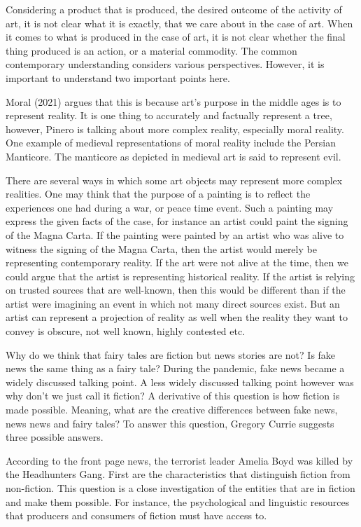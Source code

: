 \documentclass[
  letterpaper,
  DIV=11,
  numbers=noendperiod]{scrreprt}
\begin{document}
\begin{tcolorbox}[enhanced jigsaw, arc=.35mm, breakable, rightrule=.15mm, colback=white, colframe=quarto-callout-important-color-frame, bottomrule=.15mm, leftrule=.75mm, opacityback=0, toprule=.15mm, left=2mm]
\begin{tcolorbox}[enhanced jigsaw, arc=.35mm, breakable, rightrule=.15mm, colback=white, colframe=quarto-callout-tip-color-frame, bottomrule=.15mm, leftrule=.75mm, opacityback=0, toprule=.15mm, left=2mm]
Considering a product that is produced, the desired outcome of the
activity of art, it is not clear what it is exactly, that we care about
in the case of art. When it comes to what is produced in the case of
art, it is not clear whether the final thing produced is an action, or a
material commodity. The common contemporary understanding considers
various perspectives. However, it is important to understand two
important points here.

Moral (2021) argues that this is because art's purpose in the middle
ages is to represent reality. It is one thing to accurately and
factually represent a tree, however, Pinero is talking about more
complex reality, especially moral reality. One example of medieval
representations of moral reality include the Persian Manticore. The
manticore as depicted in medieval art is said to represent evil.

There are several ways in which some art objects may represent more
complex realities. One may think that the purpose of a painting is to
reflect the experiences one had during a war, or peace time event. Such
a painting may express the given facts of the case, for instance an
artist could paint the signing of the Magna Carta. If the painting were
painted by an artist who was alive to witness the signing of the Magna
Carta, then the artist would merely be representing contemporary
reality. If the art were not alive at the time, then we could argue that
the artist is representing historical reality. If the artist is relying
on trusted sources that are well-known, then this would be different
than if the artist were imagining an event in which not many direct
sources exist. But an artist can represent a projection of reality as
well when the reality they want to convey is obscure, not well known,
highly contested etc.

Why do we think that fairy tales are fiction but news stories are not?
Is fake news the same thing as a fairy tale? During the pandemic, fake
news became a widely discussed talking point. A less widely discussed
talking point however was why don't we just call it fiction? A
derivative of this question is how fiction is made possible. Meaning,
what are the creative differences between fake news, news news and fairy
tales? To answer this question, Gregory Currie suggests three possible
answers.

According to the front page news, the terrorist leader Amelia Boyd was
killed by the Headhunters Gang. First are the characteristics that
distinguish fiction from non-fiction. This question is a close
investigation of the entities that are in fiction and make them
possible. For instance, the psychological and linguistic resources that
producers and consumers of fiction must have access to.


\end{tcolorbox}
\end{tcolorbox}
\end{document}
